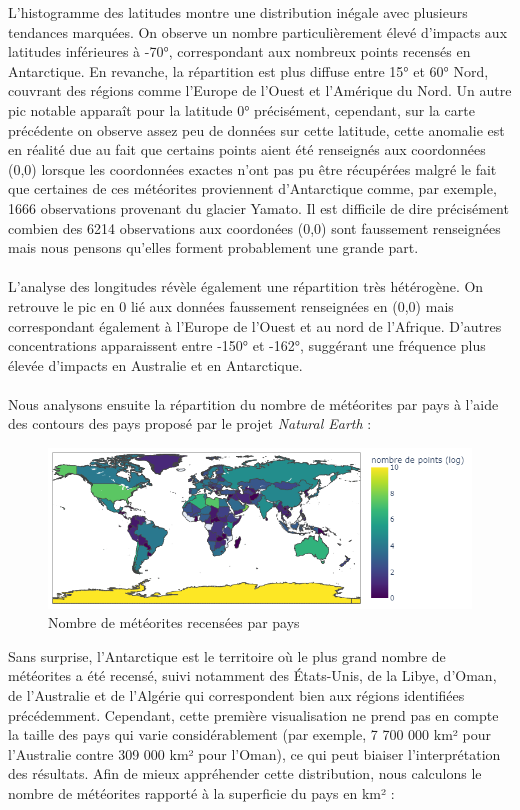 \documentclass[12pt]{article}
\begin{document}
L'histogramme des latitudes montre une distribution inégale avec plusieurs tendances marquées. On observe un nombre particulièrement élevé d'impacts aux latitudes inférieures à -70°, correspondant aux nombreux points recensés en Antarctique. En revanche, la répartition est plus diffuse entre 15° et 60° Nord, couvrant des régions comme l'Europe de l'Ouest et l'Amérique du Nord. Un autre pic notable apparaît pour la latitude 0° précisément, cependant, sur la carte précédente on observe assez peu de données sur cette latitude, cette anomalie est en réalité due au fait que certains points aient été renseignés aux coordonnées (0,0) lorsque les coordonnées exactes n'ont pas pu être récupérées malgré le fait que certaines de ces météorites proviennent d'Antarctique comme, par exemple, 1666 observations provenant du glacier Yamato.  Il est difficile de dire précisément combien des 6214  observations aux coordonées (0,0) sont faussement renseignées mais nous pensons qu'elles forment probablement une grande part.\\
\\
L'analyse des longitudes révèle également une répartition très hétérogène. On retrouve le pic en 0 lié aux données faussement renseignées en (0,0) mais correspondant également  à l'Europe de l'Ouest et au nord de l'Afrique. D'autres concentrations apparaissent entre -150° et -162°, suggérant une fréquence plus élevée d'impacts en Australie et en Antarctique.\\
\\
Nous analysons ensuite la répartition du nombre de météorites par pays à l'aide des contours des pays proposé par le projet \textit{Natural Earth} \cite{Natural_Earth} :
\begin{figure}[H]
 \centering 
\includegraphics[width=17cm]{Images/exploration/map_points_countries_avec_echelle.png}
 \caption{Nombre de météorites recensées par pays}
 \end{figure}
Sans surprise, l’Antarctique est le territoire où le plus grand nombre de météorites a été recensé, suivi notamment des États-Unis, de la Libye, d’Oman, de l’Australie et de l’Algérie qui correspondent bien aux régions identifiées précédemment. Cependant, cette première visualisation ne prend pas en compte la taille des pays qui varie considérablement (par exemple, 7 700 000 km² pour l’Australie contre 309 000 km² pour l'Oman), ce qui peut biaiser l’interprétation des résultats. Afin de mieux appréhender cette distribution, nous calculons le nombre de météorites rapporté à la superficie du pays en km² :
\end{document}
